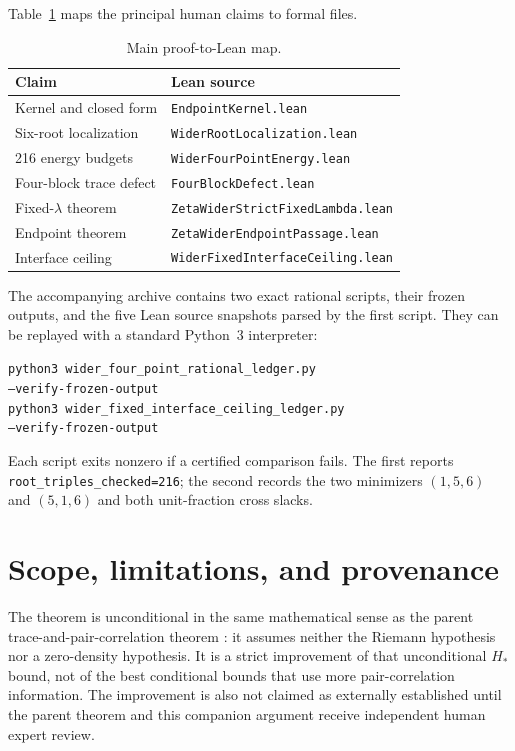 \documentclass[11pt,reqno]{amsart}
\theoremstyle{definition}
\theoremstyle{remark}
\begin{document}
Table~\ref{tab:lean-map} maps the principal human claims to formal files.
\begin{table}[ht]
\centering
\caption{Main proof-to-Lean map.}\label{tab:lean-map}
\begin{tabular}{@{}ll@{}}
\toprule
Claim & Lean source \\
\midrule
Kernel and closed form & \texttt{EndpointKernel.lean} \\
Six-root localization & \texttt{WiderRootLocalization.lean} \\
216 energy budgets & \texttt{WiderFourPointEnergy.lean} \\
Four-block trace defect & \texttt{FourBlockDefect.lean} \\
Fixed-$\lambda$ theorem & \texttt{ZetaWiderStrictFixedLambda.lean} \\
Endpoint theorem & \texttt{ZetaWiderEndpointPassage.lean} \\
Interface ceiling & \texttt{WiderFixedInterfaceCeiling.lean} \\
\bottomrule
\end{tabular}
\end{table}

The accompanying archive contains two exact rational scripts, their frozen
outputs, and the five Lean source snapshots parsed by the first script.  They
can be replayed with a standard Python~3 interpreter:
\begin{center}\small
\texttt{python3 wider\_four\_point\_rational\_ledger.py}\\
\texttt{\hspace*{12mm}--verify-frozen-output}\\
\texttt{python3 wider\_fixed\_interface\_ceiling\_ledger.py}\\
\texttt{\hspace*{12mm}--verify-frozen-output}
\end{center}
Each script exits nonzero if a certified comparison fails.  The first reports
\texttt{root\_triples\_checked=216}; the second records the two minimizers
$(1,5,6)$ and $(5,1,6)$ and both unit-fraction cross slacks.

\section{Scope, limitations, and provenance}

The theorem is unconditional in the same mathematical sense as the parent
trace-and-pair-correlation theorem \cite{Claude2026}: it assumes neither the
Riemann hypothesis nor a zero-density hypothesis.  It is a strict improvement
of that unconditional $H_*$ bound, not of the best conditional bounds that
use more pair-correlation information.  The improvement is also not claimed
as externally established until the parent theorem and this companion
argument receive independent human expert review.
\end{document}

